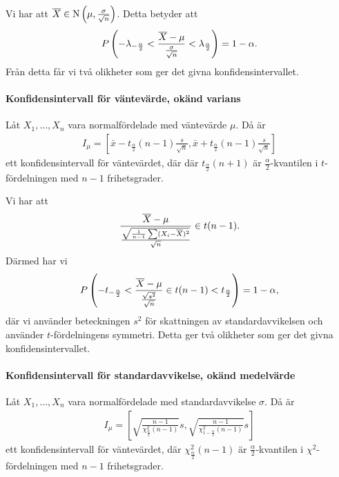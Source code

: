 \proof
Vi har att $\overline{X}\in\text{N}\left(\mu, \frac{\sigma}{\sqrt{n}}\right)$. Detta betyder att
\begin{align*}
	P\left(-\lambda_{-\frac{\alpha}{2}} < \frac{\overline{X} - \mu}{\frac{\sigma}{\sqrt{n}}} < \lambda_{\frac{\alpha}{2}}\right) = 1 - \alpha.
\end{align*}
Från detta får vi två olikheter som ger det givna konfidensintervallet.

\paragraph{Konfidensintervall för väntevärde, okänd varians}
Låt $X_1, \dots, X_{n}$ vara normalfördelade med väntevärde $\mu$. Då är
\begin{align*}
	I_{\mu} = \left[\bar{x} - t_{\frac{\alpha}{2}}(n - 1)\frac{s}{\sqrt{n}}, \bar{x} + t_{\frac{\alpha}{2}}(n - 1)\frac{s}{\sqrt{n}}\right]
\end{align*}
ett konfidensintervall för väntevärdet, där där $t_{\frac{\alpha}{2}}(n + 1)$ är $\frac{\alpha}{2}$-kvantilen i $t$-fördelningen med $n - 1$ frihetsgrader.

\proof
Vi har att
\begin{align*}
	\frac{\overline{X} - \mu}{\frac{\sqrt{\frac{1}{n - 1}\sum (X_i - \overline{X})^2}}{\sqrt{n}}}\in t(n - 1).
\end{align*}
Därmed har vi
\begin{align*}
	P\left(-t_{-\frac{\alpha}{2}} < \frac{\overline{X} - \mu}{\frac{\sqrt{s^2}}{\sqrt{n}}}\in t(n - 1) < t_{\frac{\alpha}{2}}\right) = 1 - \alpha,
\end{align*}
där vi använder beteckningen $s^2$ för skattningen av standardavvikelsen och använder $t$-fördelningens symmetri. Detta ger två olikheter som ger det givna konfidensintervallet.

\paragraph{Konfidensintervall för standardavvikelse, okänd medelvärde}
Låt $X_1, \dots, X_{n}$ vara normalfördelade med standardavvikelse $\sigma$. Då är
\begin{align*}
	I_{\mu} = \left[\sqrt{\frac{n - 1}{\chi_{\frac{\alpha}{2}}^2(n - 1)}}s, \sqrt{\frac{n - 1}{\chi_{1 - \frac{\alpha}{2}}^2(n - 1)}}s\right]
\end{align*}
ett konfidensintervall för väntevärdet, där $\chi_{\frac{\alpha}{2}}^2(n - 1)$ är $\frac{\alpha}{2}$-kvantilen i $\chi^2$-fördelningen med $n - 1$ frihetsgrader.

